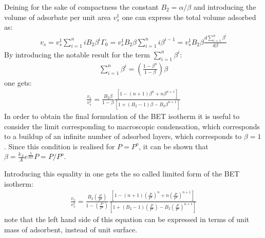 \documentclass[letterpaper,10pt,english]{jupyterBook}
\begin{document}
\sphinxAtStartPar
Deining for the sake of compactness the constant \(B_2=\alpha/\beta\) and introducing the volume of adsorbate per unit area  \(v_s^1\) one can express the total volume adsorbed as:
\begin{equation}\label{equation:BET_isotherm:BETeq14}
\begin{split}
v_s=v_s^1\sum_{i=1}^n{iB_2\beta^i\Gamma_0}=v_s^1B_2\beta\sum_{i=1}^ni\beta^{i-1}=v_s^1B_2\beta\frac{d\sum_{i=1}^n\beta^{i}}{d\beta}
\end{split}
\end{equation}
\sphinxAtStartPar
By introducing the notable result for the term \(\sum_{i=1}^n\beta^{i}\):
\begin{equation}\label{equation:BET_isotherm:BETeq15}
\begin{split}
\sum_{i=1}^n\beta^{i}=\left(\frac{1-\beta^n}{1-\beta}\right)\beta
\end{split}
\end{equation}
\sphinxAtStartPar
one gets:
\begin{equation}\label{equation:BET_isotherm:BETeq16}
\begin{split}
\frac{v_s}{v_s^1}=\frac{B_2\beta}{1-\beta}\frac{\left[1-(n+1)\beta^n+n\beta^{n+1}\right]}{\left[1+(B_2-1)\beta-B_2\beta^{n+1}\right]}
\label{eq:16}
\end{split}
\end{equation}
\sphinxAtStartPar
In order to obtain the final formulation of the BET isotherm it is useful to consider the limit corresponding to macroscopic condensation, which corresponds to a buildup of an infinite number of adsorbed layers, which corresponds to \(\beta=1\). Since this condition is realised for \(P=P^o\), it can be shown that \(\beta=\frac{k_{A}}{A}e^{\frac{\lambda}{RT}}P=P/P^o\).

\sphinxAtStartPar
Introducing this equality in  one gets the so called limited form of the BET isotherm:
\begin{equation}\label{equation:BET_isotherm:BETeq17}
\begin{split}
\frac{v_s}{v_s^1}=\frac{B_2\left(\frac{P}{P^o}\right)}{1-\left(\frac{P}{P^o}\right)}\frac{\left[1-(n+1)\left(\frac{P}{P^o}\right)^n+n\left(\frac{P}{P^o}\right)^{n+1}\right]}{\left[1+(B_2-1)\left(\frac{P}{P^o}\right)-B_2\left(\frac{P}{P^o}\right)^{n+1}\right]}
\end{split}
\end{equation}
\sphinxAtStartPar
note that the left hand side of this equation can be expressed in terms of unit mass of adsorbent, instead of unit surface.
\end{document}
